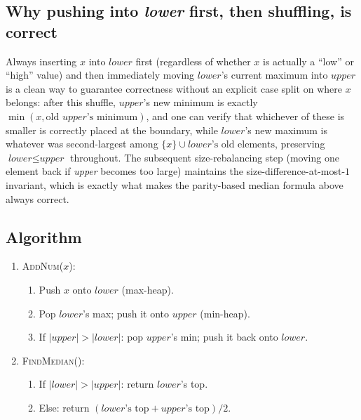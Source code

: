 \subsection*{Why pushing into \textit{lower} first, then shuffling, is correct}

Always inserting $x$ into $\textit{lower}$ first (regardless of whether
$x$ is actually a ``low'' or ``high'' value) and then immediately moving
$\textit{lower}$'s current maximum into $\textit{upper}$ is a clean way to
guarantee correctness without an explicit case split on where $x$ belongs:
after this shuffle, $\textit{upper}$'s new minimum is exactly
$\min(x, \text{old } \textit{upper}\text{'s minimum})$, and one can verify
that whichever of these is smaller is correctly placed at the boundary,
while $\textit{lower}$'s new maximum is whatever was second-largest among
$\{x\} \cup \textit{lower}\text{'s old elements}$, preserving
$\textit{lower} \le \textit{upper}$ throughout. The subsequent
size-rebalancing step (moving one element back if \textit{upper} becomes
too large) maintains the size-difference-at-most-$1$ invariant, which is
exactly what makes the parity-based median formula above always correct.

\subsection*{Algorithm}

\begin{enumerate}
  \item \textsc{AddNum}($x$):
  \begin{enumerate}
    \item Push $x$ onto $\textit{lower}$ (max-heap).
    \item Pop $\textit{lower}$'s max; push it onto $\textit{upper}$
          (min-heap).
    \item If $|\textit{upper}| > |\textit{lower}|$: pop $\textit{upper}$'s
          min; push it back onto $\textit{lower}$.
  \end{enumerate}
  \item \textsc{FindMedian}():
  \begin{enumerate}
    \item If $|\textit{lower}| > |\textit{upper}|$: return
          $\textit{lower}$'s top.
    \item Else: return $(\textit{lower}\text{'s top} +
          \textit{upper}\text{'s top}) / 2$.
  \end{enumerate}
\end{enumerate}

